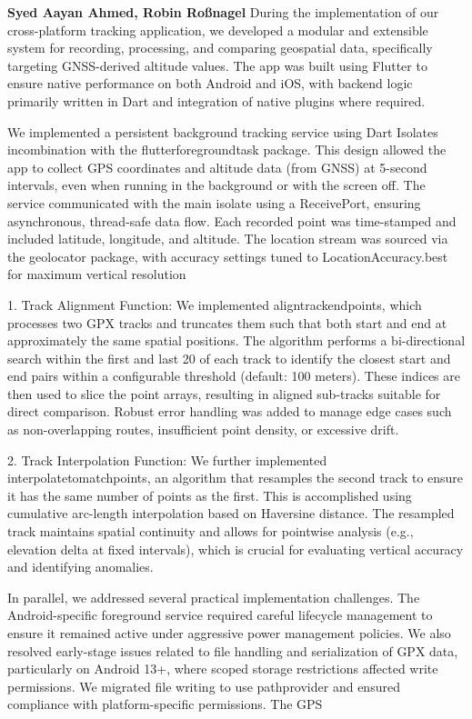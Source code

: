 \documentclass[12pt]{article}
\begin{document}
\vspace{1em}

{\large\textbf{Syed  Aayan Ahmed, Robin Roßnagel }}
During the implementation of our cross-platform tracking application, we developed a modular and extensible system for recording, processing, and comparing geospatial data,
specifically targeting GNSS-derived altitude values. The app was built using Flutter to ensure native performance on both Android and iOS, with backend logic primarily written in Dart
and integration of native plugins where required.

We implemented a persistent background tracking service using Dart Isolates incombination with the flutterforegroundtask package. This design allowed the app to collect GPS coordinates and altitude data (from GNSS) at 5-second intervals, even when running in the background or with the screen off. The service communicated with the main
isolate using a ReceivePort, ensuring asynchronous, thread-safe data flow. Each recorded point was time-stamped and included latitude, longitude, and altitude. The location stream
was sourced via the geolocator package, with accuracy settings tuned to LocationAccuracy.best for maximum vertical resolution

1. Track Alignment Function:
We implemented aligntrackendpoints, which processes two GPX tracks and
truncates them such that both start and end at approximately the same spatial
positions. The algorithm performs a bi-directional search within the first and last 20%
of each track to identify the closest start and end pairs within a configurable
threshold (default: 100 meters). These indices are then used to slice the point arrays,
resulting in aligned sub-tracks suitable for direct comparison. Robust error handling
was added to manage edge cases such as non-overlapping routes, insufficient point
density, or excessive drift.

2. Track Interpolation Function:
We further implemented interpolatetomatchpoints, an algorithm that resamples
the second track to ensure it has the same number of points as the first. This is
accomplished using cumulative arc-length interpolation based on Haversine distance.
The resampled track maintains spatial continuity and allows for pointwise analysis
(e.g., elevation delta at fixed intervals), which is crucial for evaluating vertical
accuracy and identifying anomalies.

In parallel, we addressed several practical implementation challenges. The Android-specific
foreground service required careful lifecycle management to ensure it remained active
under aggressive power management policies. We also resolved early-stage issues related to
file handling and serialization of GPX data, particularly on Android 13+, where scoped
storage restrictions affected write permissions. We migrated file writing to use
pathprovider and ensured compliance with platform-specific permissions. The GPS 
\end{document}
